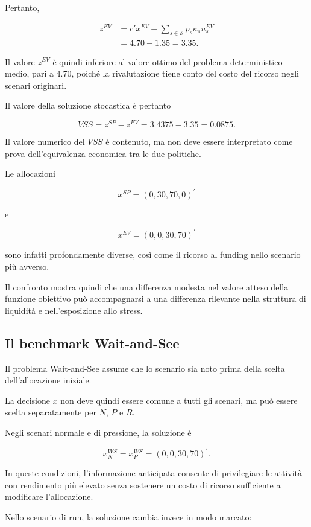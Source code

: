 Pertanto,

\[
\begin{aligned}
z^{EV}
&=
c'x^{EV}
-
\sum_{s\in\mathcal S}
p_s\kappa_su_s^{EV}
\\
&=
4.70-1.35=3.35.
\end{aligned}
\]

Il valore $z^{EV}$ \`{e} quindi
inferiore al valore ottimo
del problema deterministico medio,
pari a $4.70$, poich\'{e}
la rivalutazione tiene conto
del costo del ricorso negli
scenari originari.


Il valore della soluzione stocastica \`e pertanto

\[
VSS
=
z^{SP}-z^{EV}
=
3.4375-3.35
=
0.0875.
\]

Il valore numerico del \(VSS\) \`e contenuto, ma non deve essere interpretato
come prova dell'equivalenza economica tra le due politiche.

Le allocazioni

\[
x^{SP}
=
(0,30,70,0)^{\prime}
\]

\noindent e

\[
x^{EV}
=
(0,0,30,70)^{\prime}
\]

\noindent sono infatti profondamente diverse, cos\`i come il ricorso al funding
nello scenario pi\`u avverso.

Il confronto mostra quindi che una differenza modesta nel valore atteso della
funzione obiettivo pu\`o accompagnarsi a una differenza rilevante nella
struttura di liquidit\`a e nell'esposizione allo stress.

\subsection{Il benchmark Wait-and-See}

Il problema Wait-and-See assume che lo scenario sia noto prima della scelta
dell'allocazione iniziale.

La decisione \(x\) non deve quindi essere comune a tutti gli scenari, ma pu\`o
essere scelta separatamente per \(N\), \(P\) e \(R\).

Negli scenari normale e di pressione, la soluzione \`e

\[
x_N^{WS}
=
x_P^{WS}
=
(0,0,30,70)^{\prime}.
\]

In queste condizioni, l'informazione anticipata consente di privilegiare le
attivit\`a con rendimento pi\`u elevato senza sostenere un costo di ricorso
sufficiente a modificare l'allocazione.

Nello scenario di run, la soluzione cambia invece in modo marcato:

